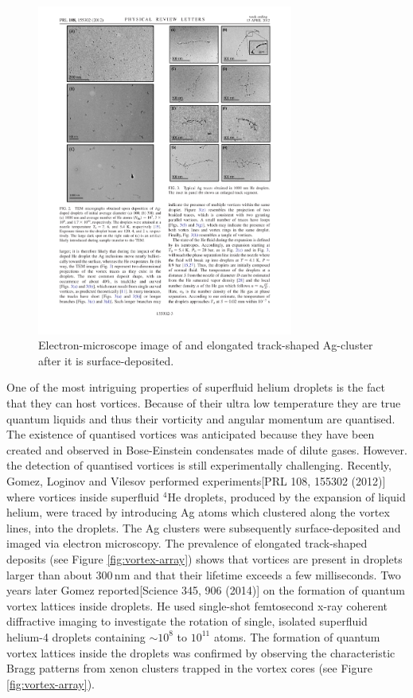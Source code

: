 \documentclass[11pt,a4paper,twoside]{article}
\newcommand{\unit}[1]{\,\mathrm{#1}}
\begin{document}
		\begin{figure}[t]
			\begin{center}
				\includegraphics[width=0.75\textwidth]{silver-filament}
			\end{center}
			\caption{Electron-microscope image of and elongated track-shaped Ag-cluster after it is surface-deposited.}
			\label{fig:silver-filament}
		\end{figure}	
				
		One of the most intriguing properties of superfluid helium droplets is the fact that they can host vortices. Because of their ultra low temperature they are true quantum liquids and thus their vorticity and angular momentum are quantised. The existence of quantised vortices was anticipated because they have been created and observed in Bose-Einstein condensates made of dilute gases. However. the detection of quantised vortices is still experimentally challenging. Recently, Gomez, Loginov and Vilesov performed experiments[PRL 108, 155302 (2012)] where vortices inside superfluid $^4$He droplets, produced by the expansion of liquid helium, were traced by introducing Ag atoms which clustered along the vortex lines, into the droplets. The Ag clusters were subsequently surface-deposited and imaged via electron microscopy. The prevalence of elongated track-shaped deposits (see Figure \ref{fig:vortex-array}) shows that vortices are present in droplets larger than about $300\unit{nm}$ and that their lifetime exceeds a few milliseconds. Two years later Gomez reported[Science 345, 906 (2014)] on the formation of quantum vortex lattices inside droplets. He used single-shot femtosecond x-ray coherent diffractive imaging to investigate the rotation of single, isolated superfluid helium-4 droplets containing $\sim\!10^8$ to $10^{11}$ atoms. The formation of quantum vortex lattices inside the droplets was confirmed by observing the characteristic Bragg patterns from xenon clusters trapped in the vortex cores (see Figure \ref{fig:vortex-array}).\\
\end{document}
